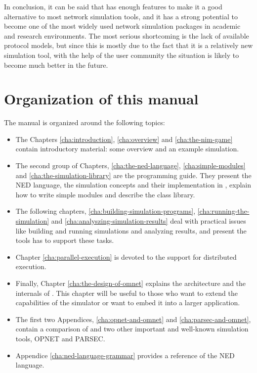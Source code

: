 In conclusion, it can be said that {\opp} has enough features 
to make it a good alternative to most network simulation tools, 
and it has a strong potential to become one of the most widely 
used network simulation packages in academic and research environments. 
The most serious shortcoming is the lack of available protocol 
models, but since this is mostly due to the fact that it is a 
relatively new simulation tool, with the help of the {\opp} 
user community the situation is likely to become much better 
in the future.





\section{Organization of this manual}

The manual is organized around the following topics:
\begin{itemize}
  \item{The Chapters \ref{cha:introduction}, \ref{cha:overview} and
    \ref{cha:the-nim-game} contain introductory material: some
    overview and an example simulation.}
  \item{The second group of Chapters, \ref{cha:the-ned-language},
    \ref{cha:simple-modules} and \ref{cha:the-simulation-library} are
    the programming guide. They present the NED language, the
    simulation concepts and their implementation in {\opp}, explain
    how to write simple modules and describe the class library.}
  \item{The following chapters,
    \ref{cha:building-simulation-programs},
    \ref{cha:running-the-simulation} and
    \ref{cha:analyszing-simulation-results} deal with practical issues
    like building and running simulations and analyzing results, and
    present the tools {\opp} has to support these tasks.}
  \item{Chapter \ref{cha:parallel-execution} is devoted to the support
    for distributed execution.}
  \item{Finally, Chapter \ref{cha:the-design-of-omnet} explains the
    architecture and the internals of {\opp}. This chapter will be
    useful to those who want to extend the capabilities of the
    simulator or want to embed it into a larger application.}
  \item{The first two Appendices, \ref{cha:opnet-and-omnet} and
    \ref{cha:parsec-and-omnet}, contain a comparison of {\opp} and
    two other important and well-known simulation tools, OPNET and
    PARSEC.}
  \item{Appendice \ref{cha:ned-language-grammar} provides a reference
    of the NED language.}
\end{itemize}




